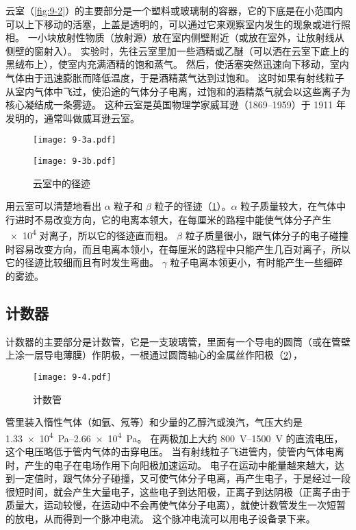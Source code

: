 云室（\cref{fig:9-2}）的主要部分是一个塑料或玻璃制的容器，它的下底是在小范围内可以上下移动的活塞，上盖是透明的，可以通过它来观察室内发生的现象或进行照相。
一小块放射性物质（放射源）放在室内侧壁附近（或放在室外，让放射线从侧壁的窗射入）。
实验时，先往云室里加一些酒精或乙醚（可以洒在云室下底上的黑绒布上），使室内充满酒精的饱和蒸气。
然后，使活塞突然迅速向下移动，室内气体由于迅速膨胀而降低温度，于是酒精蒸气达到过饱和。
这时如果有射线粒子从室内气体中飞过，使沿途的气体分子电离，过饱和的酒精蒸气就会以这些离子为核心凝结成一条雾迹。
这种云室是英国物理学家威耳逊（1869--1959）于 1911 年发明的，通常叫做威耳逊云室。

\begin{figure}
  \begin{minipage}{0.4\linewidth}\centering
    \texttt{[image: 9-3a.pdf]}
    \label{fig:9-3a}
  \end{minipage}
  \begin{minipage}{0.4\linewidth}\centering
    \texttt{[image: 9-3b.pdf]}
    \label{fig:9-3b}
  \end{minipage}
  \caption{云室中的径迹}\label{fig:9-3}
\end{figure}

用云室可以清楚地看出 $\alpha$ 粒子和 $\beta$ 粒子的径迹（\cref{fig:9-3}）。$\alpha$ 粒子质量较大，在气体中行进时不易改变方向，它的电离本领大，在每厘米的路程中能使气体分子产生 \num{e4} 对离子，所以它的径迹直而粗。
$\beta$ 粒子质量很小，跟气体分子的电子碰撞时容易改变方向，而且电离本领小，在每厘米的路程中只能产生几百对离子，所以它的径迹比较细而且有时发生弯曲。
$\gamma$ 粒子电离本领更小，有时能产生一些细碎的雾迹。

\subsection{计数器}
计数器的主要部分是计数管，它是一支玻璃管，里面有一个导电的圆筒（或在管壁上涂一层导电薄膜）作阴极，一根通过圆筒轴心的金属丝作阳极（\cref{fig:9-4}），
\begin{figure}
  \texttt{[image: 9-4.pdf]}
  \caption{计数管}\label{fig:9-4}
\end{figure}
管里装入惰性气体（如氩、氖等）和少量的乙醇汽或溴汽，气压大约是 \qtyrange{1.33e4}{2.66e4}{Pa}。
在两极加上大约 \qtyrange{800}{1500}{V} 的直流电压，这个电压略低于管内气体的击穿电压。
当有射线粒子飞进管内，使管内气体电离时，产生的电子在电场作用下向阳极加速运动。
电子在运动中能量越来越大，达到一定值时，跟气体分子碰撞，又可使气体分子电离，再产生电子，于是经过一段很短时间，就会产生大量电子，这些电子到达阳极，正离子到达阴极（正离子由于质量大，运动较慢，在运动中不会再使气体分子电离），就使计数管发生一次短暂的放电，从而得到一个脉冲电流。
这个脉冲电流可以用电子设备录下来。

